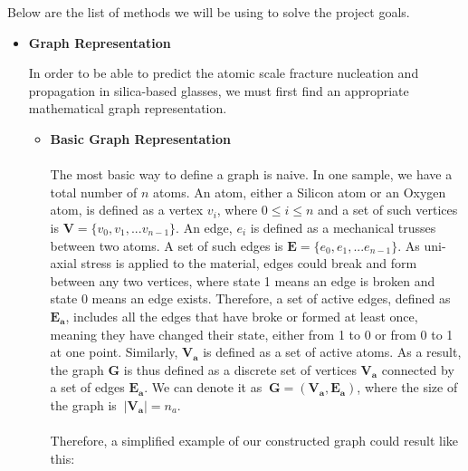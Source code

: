 Below are the list of methods we will be using to solve the project goals.

\begin{itemize}

\item \textbf{Graph Representation}


In order to be able to predict the atomic scale fracture nucleation and propagation in silica-based glasses, we must first find an appropriate mathematical graph representation. 
\begin{itemize}
    \item \textbf{Basic Graph Representation}
    \\
    \\
    The most basic way to define a graph is naive. In one sample, we have a total number of $n$ atoms. An atom, either a Silicon atom or an Oxygen atom, is defined as a vertex $v_i$, where $0 \leq i \leq n$ and a set of such vertices is $\mathbf{V} = \{v_0,v_1,...v_{n-1}\}$. An edge, $e_i$ is defined as a mechanical trusses between two atoms. A set of such edges is $\mathbf{E} = \{e_0,e_1,...e_{n-1}\}$. As uni-axial stress is applied to the material, edges could break and form between any two vertices, where state 1 means an edge is broken and state 0 means an edge exists. Therefore, a set of active edges, defined as $\mathbf{E_a}$, includes all the edges that have broke or formed at least once, meaning they have changed their state, either from 1 to 0 or from 0 to 1 at one point. Similarly, $\mathbf{V_a}$ is defined as a set of active atoms. As a result, the graph $\mathbf{G}$ is thus defined as a discrete set of vertices $\mathbf{V_a}$ connected by a set of edges $\mathbf{E_a}$. We can denote it as $\ \mathbf{G} = (\mathbf{V_a},\mathbf{E_a})$, where the size of the graph is $\ |\mathbf{V_a}| = n_a $.
    \\
    \\
    Therefore, a simplified example of our constructed graph could result like this:
    \bigskip
    \\
\end{itemize}
\end{itemize}
